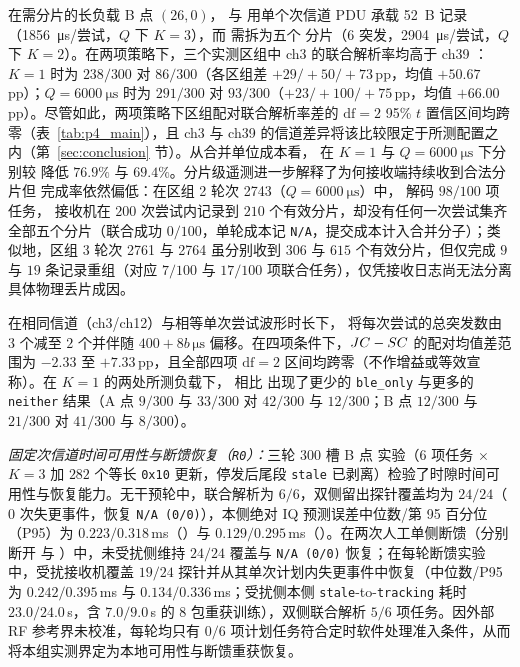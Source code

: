 在需分片的长负载 B 点 $(26,0)$，\modejc{} 与 \modesc{} 用单个次信道 PDU 承载 \SI{52}{B} \ble{} 记录（\SI{1856}{\micro\second}/尝试，$Q$ 下 $K{=}3$），而 \modelc{} 需拆为五个 \fragproto{} 分片（$6$ 突发，\SI{2904}{\micro\second}/尝试，$Q$ 下 $K{=}2$）。在两项策略下，三个实测区组中 ch3 \modejc{} 的联合解析率均高于 ch39 \modelc{}：$K{=}1$ 时为 $238/300$ 对 $86/300$（各区组差 $+29/{+}50/{+}73$\,pp，均值 $+50.67$\,pp）；$Q{=}\SI{6000}{\micro\second}$ 时为 $291/300$ 对 $93/300$（$+23/{+}100/{+}75$\,pp，均值 $+66.00$\,pp）。尽管如此，两项策略下区组配对联合解析率差的 $\text{df}{=}2$ 95\% $t$ 置信区间均跨零（表~\ref{tab:p4_main}），且 ch3 与 ch39 的信道差异将该比较限定于所测配置之内（第~\ref{sec:conclusion} 节）。从合并单位成本看，\modejc{} 在 $K{=}1$ 与 $Q{=}\SI{6000}{\micro\second}$ 下分别较 \modelc{} 降低 $76.9\%$ 与 $69.4\%$。分片级遥测进一步解释了为何接收端持续收到合法分片但 \modelc{} 完成率依然偏低：在区组 2 轮次 2743（$Q{=}\SI{6000}{\micro\second}$）中，\stdfour{} 解码 $98/100$ 项任务，\ble{} 接收机在 $200$ 次尝试内记录到 $210$ 个有效分片，却没有任何一次尝试集齐全部五个分片（联合成功 $0/100$，单轮成本记 \texttt{N/A}，提交成本计入合并分子）；类似地，区组 3 轮次 2761 与 2764 虽分别收到 $306$ 与 $615$ 个有效分片，但仅完成 $9$ 与 $19$ 条记录重组（对应 $7/100$ 与 $17/100$ 项联合任务），仅凭接收日志尚无法分离具体物理丢片成因。

在相同信道（ch3/ch12）与相等单次尝试波形时长下，\modejc{} 将每次尝试的总突发数由 $3$ 个减至 $2$ 个并伴随 $400{+}8b\,\si{\micro\second}$ 偏移。在四项条件下，$JC{}-SC{}$ 的配对均值差范围为 $-2.33$ 至 $+7.33$\,pp，且全部四项 $\text{df}{=}2$ 区间均跨零（不作增益或等效宣称）。在 $K{=}1$ 的两处所测负载下，\modejc{} 相比 \modesc{} 出现了更少的 \texttt{ble\_only} 与更多的 \texttt{neither} 结果（A 点 $9/300$ 与 $33/300$ 对 $42/300$ 与 $12/300$；B 点 $12/300$ 与 $21/300$ 对 $41/300$ 与 $8/300$）。

\emph{固定次信道时间可用性与断馈恢复（\texttt{R0}）：}三轮 $300$ 槽 B 点 \modejc{} 实验（$6$ 项任务 $\times$ $K{=}3$ 加 $282$ 个等长 \texttt{0x10} 更新，停发后尾段 \texttt{stale} 已剥离）检验了时隙时间可用性与恢复能力。无干预轮中，联合解析为 $6/6$，双侧留出探针覆盖均为 $24/24$（$0$ 次失更事件，恢复 \texttt{N/A (0/0)}），本侧绝对 IQ 预测误差中位数/第 95 百分位（P95）为 $0.223/0.318$\,ms（\ble{}）与 $0.129/0.295$\,ms（\stdfour{}）。在两次人工单侧断馈（分别断开 \ble{} 与 \stdfour{}）中，未受扰侧维持 $24/24$ 覆盖与 \texttt{N/A (0/0)} 恢复；在每轮断馈实验中，受扰接收机覆盖 $19/24$ 探针并从其单次计划内失更事件中恢复（中位数/P95 为 $0.242/0.395$\,ms 与 $0.134/0.336$\,ms；受扰侧本侧 \texttt{stale}-to-\texttt{tracking} 耗时 $23.0/24.0$\,s，含 $7.0/9.0$\,s 的 $8$ 包重获训练），双侧联合解析 $5/6$ 项任务。因外部 RF 参考界未校准，每轮均只有 $0/6$ 项计划任务符合定时软件处理准入条件，从而将本组实测界定为本地可用性与断馈重获恢复。
